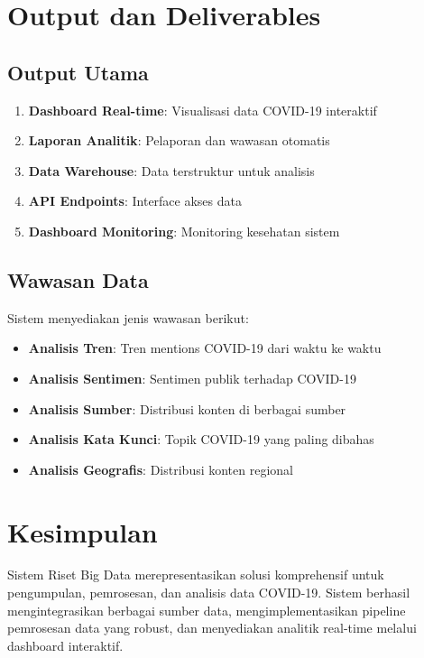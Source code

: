 \documentclass[12pt,a4paper]{article}
\begin{document}
\section{Output dan Deliverables}

\subsection{Output Utama}
\begin{enumerate}
    \item \textbf{Dashboard Real-time}: Visualisasi data COVID-19 interaktif
    \item \textbf{Laporan Analitik}: Pelaporan dan wawasan otomatis
    \item \textbf{Data Warehouse}: Data terstruktur untuk analisis
    \item \textbf{API Endpoints}: Interface akses data
    \item \textbf{Dashboard Monitoring}: Monitoring kesehatan sistem
\end{enumerate}

\subsection{Wawasan Data}
Sistem menyediakan jenis wawasan berikut:
\begin{itemize}
    \item \textbf{Analisis Tren}: Tren mentions COVID-19 dari waktu ke waktu
    \item \textbf{Analisis Sentimen}: Sentimen publik terhadap COVID-19
    \item \textbf{Analisis Sumber}: Distribusi konten di berbagai sumber
    \item \textbf{Analisis Kata Kunci}: Topik COVID-19 yang paling dibahas
    \item \textbf{Analisis Geografis}: Distribusi konten regional
\end{itemize}

\section{Kesimpulan}

Sistem Riset Big Data merepresentasikan solusi komprehensif untuk pengumpulan, pemrosesan, dan analisis data COVID-19. Sistem berhasil mengintegrasikan berbagai sumber data, mengimplementasikan pipeline pemrosesan data yang robust, dan menyediakan analitik real-time melalui dashboard interaktif.
\end{document}
